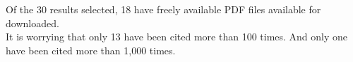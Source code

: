 


Of the 30 results selected, 18 have freely available PDF files available for downloaded.\\

It is worrying that only 13 have been cited more than 100 times. And only one have been cited more than 1,000 times.\\
